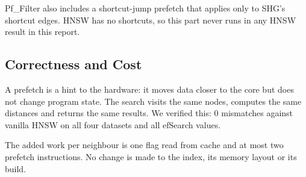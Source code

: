 Pf\_Filter also includes a shortcut-jump prefetch that applies only to SHG's
shortcut edges. HNSW has no shortcuts, so this part never runs in any HNSW
result in this report.

\subsection{Correctness and Cost}

A prefetch is a hint to the hardware: it moves data closer to the core but does
not change program state. The search visits the same nodes, computes the same
distances and returns the same results. We verified this: 0 mismatches against
vanilla HNSW on all four datasets and all efSearch values.

The added work per neighbour is one flag read from cache and at most two
prefetch instructions. No change is made to the index, its memory layout or
its build.

